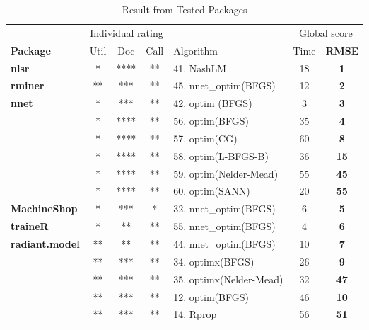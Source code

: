 \begin{Schunk}
\begin{table}

\caption{\label{tab:unnamed-chunk-3}Result from Tested Packages}
\centering
\fontsize{7}{9}\selectfont
\begin{tabular}[t]{>{\bfseries}lccclc>{\bfseries}c}
\toprule
\multicolumn{1}{c}{ } & \multicolumn{3}{c}{Individual rating} & \multicolumn{1}{c}{ } & \multicolumn{2}{c}{Global score} \\
\cmidrule(l{3pt}r{3pt}){2-4} \cmidrule(l{3pt}r{3pt}){6-7}
Package & Util & Doc & Call & Algorithm & Time & RMSE\\
\midrule
nlsr & * & **** & ** & 41. NashLM & 18 & 1\\
\cmidrule{1-7}
rminer & ** & *** & ** & 45. nnet\_optim(BFGS) & 12 & 2\\
\cmidrule{1-7}
nnet & * & *** & ** & 42. optim (BFGS) & 3 & 3\\
\cmidrule{1-7}
 & * & **** & ** & 56. optim(BFGS) & 35 & 4\\

 & * & **** & ** & 57. optim(CG) & 60 & 8\\

 & * & **** & ** & 58. optim(L-BFGS-B) & 36 & 15\\

 & * & **** & ** & 59. optim(Nelder-Mead) & 55 & 45\\

\multirow{-5}{*}{\raggedright\arraybackslash validann} & * & **** & ** & 60. optim(SANN) & 20 & 55\\
\cmidrule{1-7}
MachineShop & * & *** & * & 32. nnet\_optim(BFGS) & 6 & 5\\
\cmidrule{1-7}
traineR & * & ** & ** & 55. nnet\_optim(BFGS) & 4 & 6\\
\cmidrule{1-7}
radiant.model & ** & ** & ** & 44. nnet\_optim(BFGS) & 10 & 7\\
\cmidrule{1-7}
 & ** & *** & ** & 34. optimx(BFGS) & 26 & 9\\

\multirow{-2}{*}{\raggedright\arraybackslash monmlp} & ** & *** & ** & 35. optimx(Nelder-Mead) & 32 & 47\\
\cmidrule{1-7}
 & ** & *** & ** & 12. optim(BFGS) & 46 & 10\\

 & ** & *** & ** & 14. Rprop & 56 & 51\\


\end{tabular}
\end{table}
\end{Schunk}
